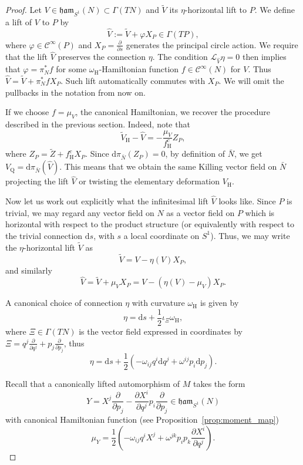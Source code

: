 \documentclass{article}
\theoremstyle{definition}
\newcommand{\calC}{\mathcal{C}}
\newcommand{\calL}{\mathcal{L}}
\newcommand{\hor}{\mathrm{H}}
\newcommand{\rmQ}{\mathrm{Q}}
\newcommand{\pd}[2]{\frac{\partial #1}{\partial #2}}
\renewcommand{\d}{\mathrm{d}}
\begin{document}
    \begin{proof}
		Let $V\in\mathfrak{ham}_{S^1}(N)\subset\Gamma(TN)$ and $\tilde V$ its $\eta$-horizontal lift to $P$. We define a lift of $V$ to $P$ by $$\hat{V}:=\tilde{V}+\varphi X_P\in\Gamma(TP),$$ where $\varphi\in\calC^\infty(P)$ and $X_P=\pd{}{s}$ generates the principal circle action. We require that the lift $\hat V$ preserves the connection $\eta$. The condition $\calL_{\hat V}\eta=0$ then implies that $\varphi=\pi_N^*f$ for some $\omega_\hor$-Hamiltonian function $f\in\calC^\infty(N)$ for $V$. Thus $\hat V=\tilde V+\pi_N^*fX_P$. Such lift automatically commutes with $X_P$. We will omit the pullbacks in the notation from now on.\medskip
		
		If we choose $f=\mu_V$, the canonical Hamiltonian, we recover the procedure described in the previous section. Indeed, note that $$\tilde{V}_\hor-\hat V=-\frac{\mu_V}{f_\hor^c}Z_P,$$ where $Z_P=\tilde{Z}+f_\hor^cX_P$. Since $\d\pi_{\bar N}(Z_P)=0$, by definition of $\bar N$, we get $V_\rmQ=\d\pi_{\bar N}(\hat V)$. This means that we obtain the same Killing vector field on $\bar N$ projecting the lift $\hat V$ or twisting the elementary deformation $V_\hor$.\medskip
		
		Now let us work out explicitly what the infinitesimal lift $\hat{V}$ looks like. Since $P$ is trivial, we may regard any vector field on $N$ as a vector field on $P$ which is horizontal with respect to the product structure (or equivalently with respect to the trivial connection $\d s$, with $s$ a local coordinate on $S^1$). Thus, we may write the $\eta$-horizontal lift $\tilde{V}$ as $$\tilde{V}=V-\eta(V)X_P,$$ and similarly \begin{equation}\label{eq:V_hat}
            \hat{V}=\tilde{V}+\mu_VX_P=V-(\eta(V)-\mu_V)X_P.
        \end{equation}
		
		A canonical choice of connection $\eta$ with curvature $\omega_\hor$ is given by $$\eta=\d s+\frac{1}{2}\iota_\Xi\omega_\hor,$$ where $\Xi\in\Gamma(TN)$ is the vector field expressed in coordinates by $\Xi=q^j\pd{}{q^j}+p_j\pd{}{p_j}$, thus $$\eta=\d s+\frac{1}{2}(-\omega_{ij}q^i\d q^j+\omega^{ij}p_i\d p_j).$$
		
		Recall that a canonically lifted automorphism of $M$ takes the form $$Y=X^j\pd{}{p_j}-\pd{X^i}{q^j}p_i\pd{}{p_j}\in\mathfrak{ham}_{S^1}(N)$$ with canonical Hamiltonian function (see Proposition~\ref{prop:moment_map}) $$\mu_Y=\frac{1}{2}\left(-\omega_{ij}q^iX^j+\omega^{jk}p_ip_k\pd{X^i}{q^j}\right).$$
		

\end{proof}
\end{document}
